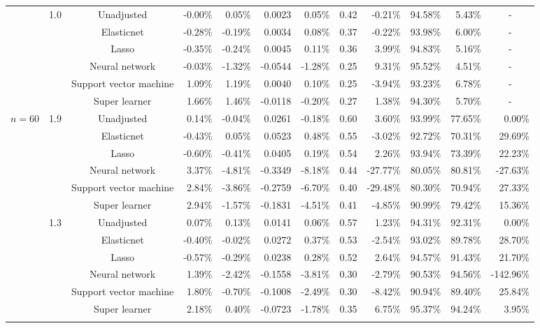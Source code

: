\documentclass{article}
\begin{document}
\begin{center}
\begin{table}[!ht]
\begin{tabular*}{\textwidth}{@{\extracolsep\fill}c|c|c|rrrr|rrrrr}
        ~ & \multirow{6}{*}{1.0} & Unadjusted & -0.00\% & 0.05\% & 0.0023 & 0.05\% & 0.42 & -0.21\% & 94.58\% & 5.43\% & \multicolumn{1}{c}{-} \\ 
        ~ & ~ & Elasticnet & -0.28\% & -0.19\% & 0.0034 & 0.08\% & 0.37 & -0.22\% & 93.98\% & 6.00\% & \multicolumn{1}{c}{-} \\ 
        ~ & ~ & Lasso & -0.35\% & -0.24\% & 0.0045 & 0.11\% & 0.36 & 3.99\% & 94.83\% & 5.16\% & \multicolumn{1}{c}{-} \\ 
        ~ & ~ & Neural network & -0.03\% & -1.32\% & -0.0544 & -1.28\% & 0.25 & 9.31\% & 95.52\% & 4.51\% & \multicolumn{1}{c}{-} \\ 
        ~ & ~ & Support vector machine & 1.09\% & 1.19\% & 0.0040 & 0.10\% & 0.25 & -3.94\% & 93.23\% & 6.78\% & \multicolumn{1}{c}{-} \\ 
        ~ & ~ & Super learner & 1.66\% & 1.46\% & -0.0118 & -0.20\% & 0.27 & 1.38\% & 94.30\% & 5.70\% & \multicolumn{1}{c}{-} \\   \hline
        
        
         \multirow{18}{*}{$n = 60$} & \multirow{6}{*}{1.9} & Unadjusted & 0.14\% & -0.04\% & 0.0261 & -0.18\% & 0.60 & 3.60\% & 93.99\% & 77.65\% & 0.00\% \\
        ~ & ~ & Elasticnet & -0.43\% & 0.05\% & 0.0523 & 0.48\% & 0.55 & -3.02\% & 92.72\% & 70.31\% & 29.69\% \\
        ~ & ~ & Lasso & -0.60\% & -0.41\% & 0.0405 & 0.19\% & 0.54 & 2.26\% & 93.94\% & 73.39\% & 22.23\% \\ 
        ~ & ~ & Neural network & 3.37\% & -4.81\% & -0.3349 & -8.18\% & 0.44 & -27.77\% & 80.05\% & 80.81\% & -27.63\% \\
        ~ & ~ & Support vector machine & 2.84\% & -3.86\% & -0.2759 & -6.70\% & 0.40 & -29.48\% & 80.30\% & 70.94\% & 27.33\% \\
        ~ & ~ & Super learner & 2.94\% & -1.57\% & -0.1831 & -4.51\% & 0.41 & -4.85\% & 90.99\% & 79.42\% & 15.36\% \\ \cline{2-12}
        
        ~ & \multirow{6}{*}{1.3} & Unadjusted & 0.07\% & 0.13\% & 0.0141 & 0.06\% & 0.57 & 1.23\% & 94.31\% & 92.31\% & 0.00\% \\
        ~ & ~ & Elasticnet & -0.40\% & -0.02\% & 0.0272 & 0.37\% & 0.53 & -2.54\% & 93.02\% & 89.78\% & 28.70\% \\
        ~ & ~ & Lasso & -0.57\% & -0.29\% & 0.0238 & 0.28\% & 0.52 & 2.64\% & 94.57\% & 91.43\% & 21.70\% \\
        ~ & ~ & Neural network & 1.39\% & -2.42\% & -0.1558 & -3.81\% & 0.30 & -2.79\% & 90.53\% & 94.56\% & -142.96\% \\
        ~ & ~ & Support vector machine & 1.80\% & -0.70\% & -0.1008 & -2.49\% & 0.30 & -8.42\% & 90.94\% & 89.40\% & 25.84\% \\
        ~ & ~ & Super learner & 2.18\% & 0.40\% & -0.0723 & -1.78\% & 0.35 & 6.75\% & 95.37\% & 94.24\% & 3.95\% \\  \cline{2-12}
        

\end{tabular*}
\end{table}
\end{center}
\end{document}
